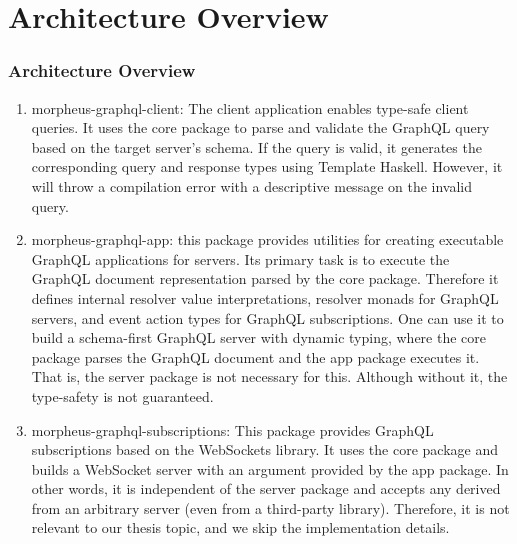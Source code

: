 \section{Architecture Overview}

\begin{frame}\frametitle{Architecture Overview}

\begin{enumerate} 
   low level language functionalities and common types and operations, such as  parsing, pretty-printing, and validation of GraphQL queries and schema documents, AST for the GraphQL type system and query language.

  \item morpheus-graphql-client: The client application enables type-safe client queries. It uses the core package to parse and validate the GraphQL query based on the target server's schema. 
  If the query is valid, it generates the corresponding query and response types using Template Haskell. However, it will throw a compilation error with a   descriptive message on the invalid query.
    
  \item morpheus-graphql-app: this package provides utilities for creating executable GraphQL applications for servers.  Its primary task is to execute the 
  GraphQL document representation parsed by the core package. 
  Therefore it defines internal resolver value interpretations, resolver monads for GraphQL servers, and event action types for GraphQL 
  subscriptions. One can use it to build a schema-first GraphQL server 
  with dynamic typing, where the core package parses 
  the GraphQL document and the app package executes it. 
  That is, the server package is not necessary for this. 
  Although without it, the type-safety is not guaranteed. 
  
  \item morpheus-graphql-subscriptions: This package provides GraphQL subscriptions based on the WebSockets library. 
  It uses the core package and builds a WebSocket server 
  with an  argument provided by the app package. 
  In other words, it is independent of the server package and 
  accepts any  derived from an arbitrary server 
  (even from a third-party library). Therefore, it is not relevant to our thesis topic, and we skip the implementation details.


\end{enumerate}
\end{frame}
